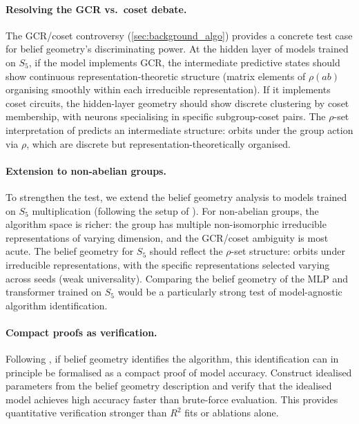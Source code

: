 \documentclass[11pt,a4paper]{article}
\begin{document}
\paragraph{Resolving the GCR vs.\ coset debate.} The GCR/coset controversy (\cref{sec:background_algo}) provides a concrete test case for belief geometry's discriminating power. At the hidden layer of models trained on $S_5$, if the model implements GCR, the intermediate predictive states should show continuous representation-theoretic structure (matrix elements of $\rho(ab)$ organising smoothly within each irreducible representation). If it implements coset circuits, the hidden-layer geometry should show discrete clustering by coset membership, with neurons specialising in specific subgroup-coset pairs. The $\rho$-set interpretation of \citet{wu2024unified} predicts an intermediate structure: orbits under the group action via $\rho$, which are discrete but representation-theoretically organised.

\paragraph{Extension to non-abelian groups.} To strengthen the test, we extend the belief geometry analysis to models trained on $S_5$ multiplication (following the setup of \citet{chughtai2023toy, stander2024grokking, wu2024unified}). For non-abelian groups, the algorithm space is richer: the group has multiple non-isomorphic irreducible representations of varying dimension, and the GCR/coset ambiguity is most acute. The belief geometry for $S_5$ should reflect the $\rho$-set structure: orbits under irreducible representations, with the specific representations selected varying across seeds (weak universality). Comparing the belief geometry of the MLP and transformer trained on $S_5$ would be a particularly strong test of model-agnostic algorithm identification.

\paragraph{Compact proofs as verification.} Following \citet{wu2024unified}, if belief geometry identifies the algorithm, this identification can in principle be formalised as a compact proof of model accuracy. Construct idealised parameters from the belief geometry description and verify that the idealised model achieves high accuracy faster than brute-force evaluation. This provides quantitative verification stronger than $R^2$ fits or ablations alone.
\end{document}
